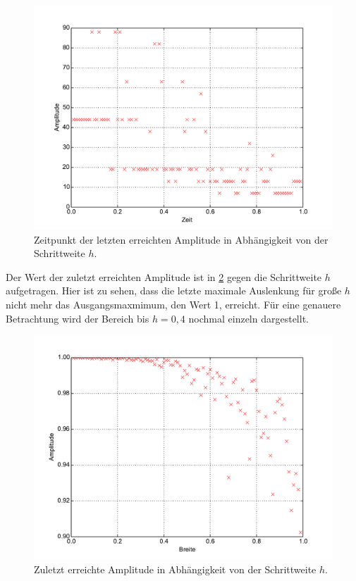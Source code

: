 \begin{figure}[h]
	\centering
	\includegraphics[width = \textwidth]{../Plots/Plot_2_B_Stabilitaet_Zeit.pdf}
	\caption{Zeitpunkt der letzten erreichten Amplitude in Abhängigkeit von der Schrittweite $h$.\label{fig:AmplitudeSchritt}}
\end{figure}\newpage
Der Wert der zuletzt erreichten Amplitude ist in \cref{fig:Stabilitaet} gegen die Schrittweite $h$ aufgetragen.
Hier ist zu sehen, dass die letzte maximale Auslenkung für große $h$ nicht mehr das Ausgangsmaxmimum, den Wert 1, erreicht.
Für eine genauere Betrachtung wird der Bereich bis $h=0,4$ nochmal einzeln dargestellt.
\begin{figure}[H]
	\centering
	\includegraphics[width = \textwidth]{../Plots/Plot_2_B_Stabilitaet.pdf}
	\caption{Zuletzt erreichte Amplitude in Abhängigkeit von der Schrittweite $h$.\label{fig:Stabilitaet}}
\end{figure}
